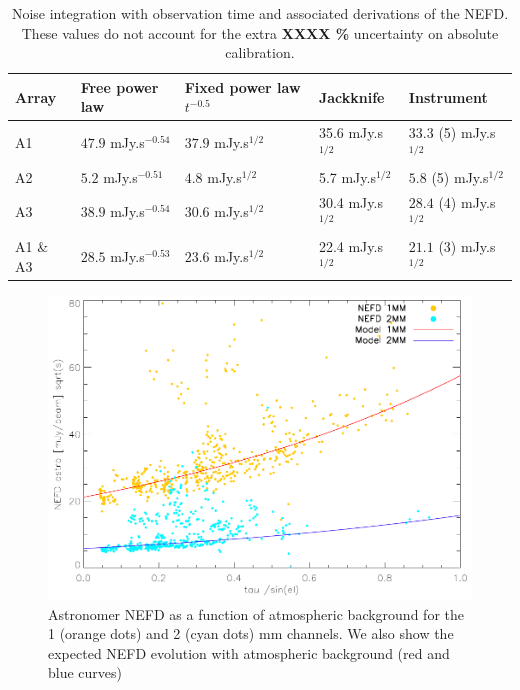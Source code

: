 \begin{table}
\begin{tabular}{|l|l|l|l|l|}
\hline
Array & Free power law & Fixed power law $t^{-0.5}$ & Jackknife & Instrument \\
\hline
A1       & $47.9$ mJy.s$^{-0.54}$ & $37.9$ mJy.s$^{1/2}$ & 35.6 mJy.s$^{1/2}$ & $33.3$ (5) mJy.s$^{1/2}$\\
A2       & $5.2$  mJy.s$^{-0.51}$ & $4.8$  mJy.s$^{1/2}$ & 5.7  mJy.s$^{1/2}$ & $5.8$  (5) mJy.s$^{1/2}$\\
A3       & $38.9$ mJy.s$^{-0.54}$ & $30.6$ mJy.s$^{1/2}$ & 30.4 mJy.s$^{1/2}$ & $28.4$ (4) mJy.s$^{1/2}$\\
A1 \& A3 & $28.5$ mJy.s$^{-0.53}$ & $23.6$ mJy.s$^{1/2}$ & 22.4 mJy.s$^{1/2}$ & $21.1$ (3) mJy.s$^{1/2}$\\
\hline
\end{tabular}
\label{tab:nefd}
\caption{Noise integration with observation time and associated derivations of
  the NEFD. These values do not account for the extra {\color{red} \bf XXXX \%}
  uncertainty on absolute calibration.}
\end{table}


\begin{figure}
\begin{center}
\includegraphics[clip, angle=0, scale =0.8]{Figures/NEFDIndScans/nefd_tau_run22.pdf}
\caption{Astronomer NEFD as a function of atmospheric background for the 1 (orange dots) and 2 (cyan dots) mm channels. We also show the expected NEFD evolution with atmospheric background (red and blue curves)}
\label{fig:nefdvsbackground}
\end{center}
\end{figure}

